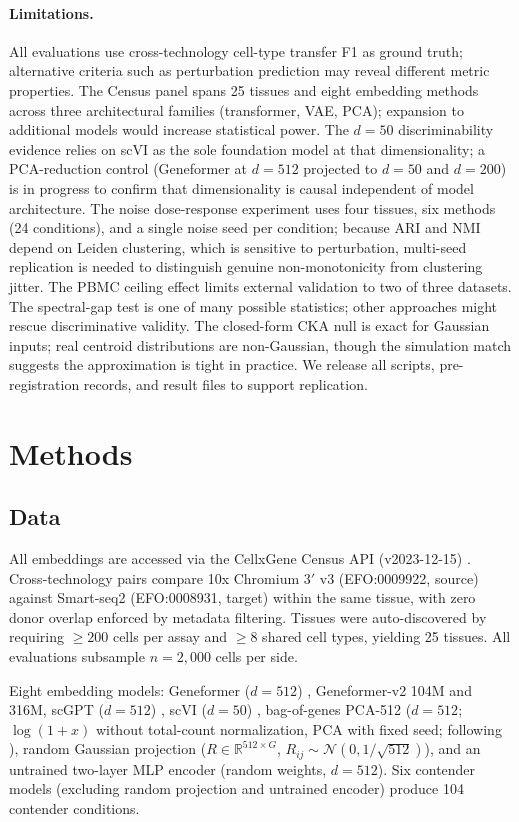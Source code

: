 \documentclass[11pt]{article}
\begin{document}
\paragraph{Limitations.} All evaluations use cross-technology cell-type
transfer F1 as ground truth; alternative criteria such as perturbation
prediction may reveal different metric properties. The Census panel
spans 25 tissues and eight embedding methods across three architectural
families (transformer, VAE, PCA); expansion to additional models would
increase statistical power. The $d = 50$ discriminability evidence
relies on scVI as the sole foundation model at that dimensionality; a
PCA-reduction control (Geneformer at $d = 512$ projected to $d = 50$
and $d = 200$) is in progress to confirm that dimensionality is causal
independent of model architecture. The noise dose-response experiment
uses four tissues, six methods (24 conditions), and a single noise seed
per condition; because ARI and NMI depend on Leiden clustering, which is
sensitive to perturbation, multi-seed replication is needed to
distinguish genuine non-monotonicity from clustering jitter. The PBMC ceiling effect limits
external validation to two of three datasets. The spectral-gap test is
one of many possible statistics; other approaches might rescue
discriminative validity. The closed-form CKA null is exact for Gaussian
inputs; real centroid distributions are non-Gaussian, though the
simulation match suggests the approximation is tight in practice. We
release all scripts, pre-registration records, and result files to
support replication.


\section{Methods}

\subsection{Data}

All embeddings are accessed via the CellxGene Census API (v2023-12-15)
\citep{abdulla2025cellxgene}. Cross-technology pairs compare 10x
Chromium 3$'$ v3 (EFO:0009922, source) against Smart-seq2
(EFO:0008931, target) within the same tissue, with zero donor overlap
enforced by metadata filtering. Tissues were auto-discovered by
requiring $\geq 200$ cells per assay and $\geq 8$ shared cell types,
yielding 25 tissues. All evaluations subsample $n = 2{,}000$ cells per
side.

Eight embedding models: Geneformer ($d = 512$)
\citep{theodoris2023geneformer}, Geneformer-v2 104M and 316M,
scGPT ($d = 512$) \citep{cui2024scgpt}, scVI ($d = 50$)
\citep{lopez2018scvi}, bag-of-genes PCA-512 ($d = 512$;
$\log(1 + x)$ without total-count normalization, PCA with fixed seed;
following \citealp{cole2026morpheus}), random Gaussian projection
($R \in \mathbb{R}^{512 \times G}$, $R_{ij} \sim \mathcal{N}(0,
1/\sqrt{512})$), and an untrained two-layer MLP encoder (random weights,
$d = 512$). Six contender models (excluding random projection and
untrained encoder) produce 104 contender conditions.
\end{document}
